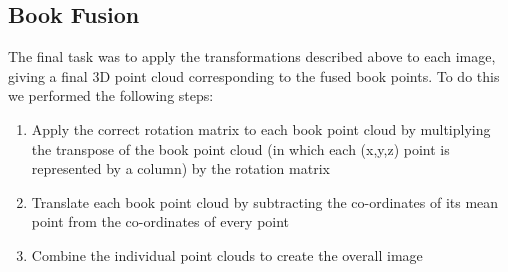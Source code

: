 \subsection{Book Fusion}

The final task was to apply the transformations described above to each image, giving a final 3D point cloud corresponding to the fused book points. To do this we performed the following steps:

\begin{enumerate}
	\item Apply the correct rotation matrix to each book point cloud by multiplying the transpose of the book point cloud (in which each (x,y,z) point is represented by a column) by the rotation matrix
	\item Translate each book point cloud by subtracting the co-ordinates of its mean point from the co-ordinates of every point
	\item Combine the individual point clouds to create the overall image
\end{enumerate}




